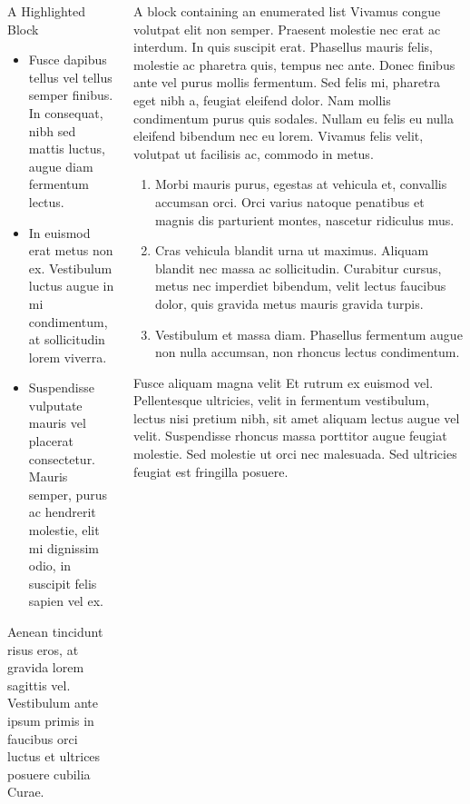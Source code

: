 \documentclass[final]{beamer}
\newlength{\sepwidth}
\newcommand{\separatorcolumn}{\begin{column}{\sepwidth}\end{column}}
\begin{document}
\begin{frame}[label={sec:orgd60d47b}]{}
\begin{columns}
\begin{column}{0.3\columnwidth}
\begin{alertblock}{A Highlighted Block}
\begin{itemize}
\item \alert{Fusce dapibus tellus} vel tellus semper finibus. In consequat, nibh sed
mattis luctus, augue diam fermentum lectus.
\item \alert{In euismod erat metus} non ex. Vestibulum luctus augue in
mi condimentum, at sollicitudin lorem viverra.
\item \alert{Suspendisse vulputate} mauris vel placerat consectetur.  Mauris semper, purus
ac hendrerit molestie, elit mi dignissim odio, in suscipit felis sapien vel
ex.
\end{itemize}

Aenean tincidunt risus eros, at gravida lorem sagittis vel. Vestibulum ante
ipsum primis in faucibus orci luctus et ultrices posuere cubilia Curae.

\end{alertblock}
\end{column}

\begin{column}{0.3\columnwidth}
\begin{block}{A block containing an enumerated list}
Vivamus congue volutpat elit non semper. Praesent molestie nec erat ac
interdum. In quis suscipit erat. \alert{Phasellus mauris felis, molestie ac pharetra
quis}, tempus nec ante. Donec finibus ante vel purus mollis fermentum. Sed felis
mi, pharetra eget nibh a, feugiat eleifend dolor. Nam mollis condimentum purus
quis sodales. Nullam eu felis eu nulla eleifend bibendum nec eu lorem. Vivamus
felis velit, volutpat ut facilisis ac, commodo in metus.

\begin{enumerate}
\item \alert{Morbi mauris purus}, egestas at vehicula et, convallis accumsan orci. Orci
varius natoque penatibus et magnis dis parturient montes, nascetur ridiculus
mus.
\item \alert{Cras vehicula blandit urna ut maximus}. Aliquam blandit nec massa ac
sollicitudin. Curabitur cursus, metus nec imperdiet bibendum, velit lectus
faucibus dolor, quis gravida metus mauris gravida turpis.
\item \alert{Vestibulum et massa diam}. Phasellus fermentum augue non nulla accumsan, non
rhoncus lectus condimentum.
\end{enumerate}
\end{block}

\begin{block}{Fusce aliquam magna velit}
Et rutrum ex euismod vel. Pellentesque ultricies, velit in fermentum
vestibulum, lectus nisi pretium nibh, sit amet aliquam lectus augue vel
velit. Suspendisse rhoncus massa porttitor augue feugiat molestie. Sed
molestie ut orci nec malesuada. Sed ultricies feugiat est fringilla
posuere.


\end{block}
\end{column}
\end{columns}
\end{frame}
\end{document}
